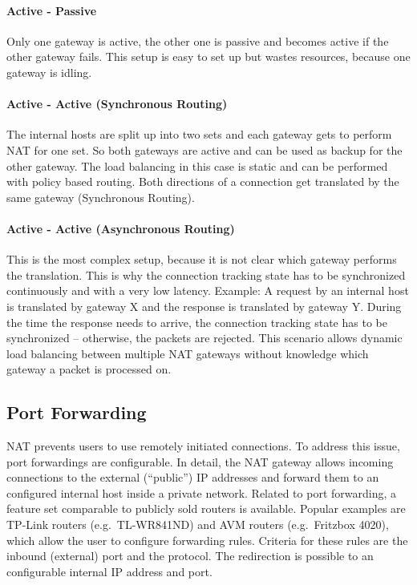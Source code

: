 \documentclass{report}
\begin{document}
\paragraph{Active - Passive}

Only one gateway is active, the other one is passive and becomes active
if the other gateway fails. This setup is easy to set up but wastes
resources, because one gateway is idling.

\paragraph{Active - Active (Synchronous Routing)}

The internal hosts are split up into two sets and each gateway gets to
perform NAT for one set. So both gateways are active and can be used as
backup for the other gateway. The load balancing in this case is static
and can be performed with policy based routing. Both directions of a
connection get translated by the same gateway (Synchronous Routing).

\paragraph{Active - Active (Asynchronous Routing)}

This is the most complex setup, because it is not clear which gateway
performs the translation. This is why the connection tracking state has
to be synchronized continuously and with a very low latency.
Example: A request by an internal host is translated by gateway X and the response
is translated by gateway Y. During the time the response needs to
arrive, the connection tracking state has to be synchronized -- otherwise,
the packets are rejected. This scenario allows dynamic load balancing
between multiple NAT gateways without knowledge which gateway a packet is processed on.


\subsection{Port Forwarding}\label{port-forwarding}

NAT prevents users to use remotely initiated connections. To address
this issue, port forwardings are configurable. In detail, the NAT
gateway allows incoming connections to the external (``public'') IP addresses
and forward them to an configured internal host inside a private
network. Related to port forwarding, a feature set comparable to
publicly sold routers is available. Popular examples are TP-Link
routers (e.g.~TL-WR841ND\cite{TL-WR}) and AVM routers (e.g.~Fritzbox 4020\cite{fritzbox}), which
allow the user to configure forwarding rules. Criteria for these rules are the
inbound (external) port and the protocol. The redirection is possible to
an configurable internal IP address and port.
\end{document}
